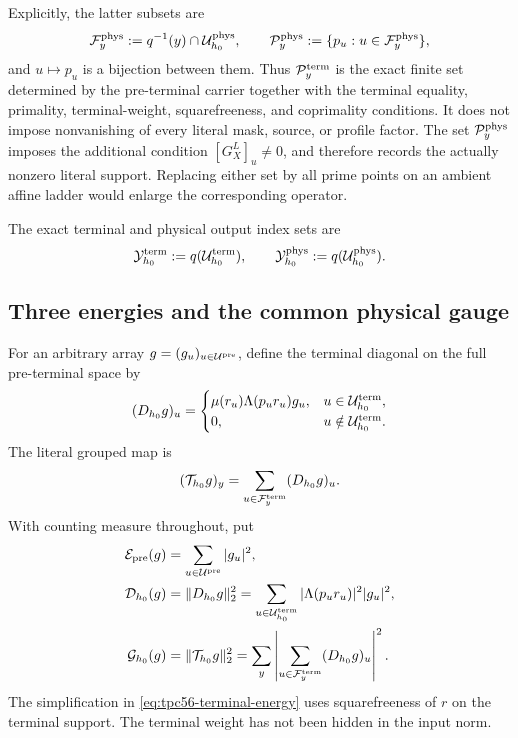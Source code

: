 Explicitly, the latter subsets are
\begin{equation}
 \mathcal F_y^{\rm phys}
 :=q^{-1}(y)\cap\mathcal U_{h_0}^{\rm phys},
 \qquad
 \mathcal P_y^{\rm phys}
 :=\{p_u:u\in\mathcal F_y^{\rm phys}\},
 \label{eq:tpc56-physical-fiber-prime-sets}
\end{equation}
and \(u\mapsto p_u\) is a bijection between them.
Thus \(\mathcal P_y^{\rm term}\) is the exact finite set determined by the
pre-terminal carrier together with the terminal equality, primality,
terminal-weight, squarefreeness, and coprimality conditions.  It does not
impose nonvanishing of every literal mask, source, or profile factor.  The
set \(\mathcal P_y^{\rm phys}\) imposes the additional condition
\([G_X^L]_u\ne0\), and therefore records the actually nonzero literal
support.  Replacing either set by all prime points on an ambient affine
ladder would enlarge the corresponding operator.

The exact terminal and physical output index sets are
\begin{equation}
 \mathcal Y_{h_0}^{\rm term}:=q(\mathcal U_{h_0}^{\rm term}),
 \qquad
 \mathcal Y_{h_0}^{\rm phys}:=q(\mathcal U_{h_0}^{\rm phys}).
 \label{eq:tpc56-output-index-sets}
\end{equation}

\subsection{Three energies and the common physical gauge}

For an arbitrary array \(g=(g_u)_{u\in\mathcal U^{\rm pre}}\), define the terminal
diagonal on the full pre-terminal space by
\begin{equation}
 (D_{h_0}g)_u=
 \begin{cases}
  \mu(r_u)\Lambda(p_ur_u)g_u,
       &u\in\mathcal U_{h_0}^{\rm term},\\
  0,&u\notin\mathcal U_{h_0}^{\rm term}.
 \end{cases}
 \label{eq:tpc56-terminal-diagonal}
\end{equation}
The literal grouped map is
\begin{equation}
 (\mathcal T_{h_0}g)_y
 =\sum_{u\in\mathcal F_y^{\rm term}}(D_{h_0}g)_u.
 \label{eq:tpc56-grouped-map}
\end{equation}
With counting measure throughout, put
\begin{align}
 \mathcal E_{\rm pre}(g)
 &=\sum_{u\in\mathcal U^{\rm pre}}|g_u|^2,
 \label{eq:tpc56-preterminal-energy}\\
 \mathcal D_{h_0}(g)
 &=\|D_{h_0}g\|_2^2
 =\sum_{u\in\mathcal U_{h_0}^{\rm term}}
   |\Lambda(p_ur_u)|^2|g_u|^2,
 \label{eq:tpc56-terminal-energy}\\
 \mathcal G_{h_0}(g)
 &=\|\mathcal T_{h_0}g\|_2^2
 =\sum_y\left|\sum_{u\in\mathcal F_y^{\rm term}}
  (D_{h_0}g)_u\right|^2.
 \label{eq:tpc56-grouped-energy}
\end{align}
The simplification in \eqref{eq:tpc56-terminal-energy} uses squarefreeness
of \(r\) on the terminal support.  The terminal weight has not been hidden
in the input norm.

